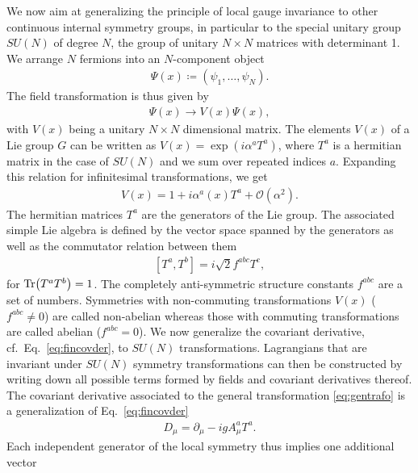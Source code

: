 We now aim at generalizing the principle of local gauge invariance
to other continuous internal symmetry groups, in particular to the special
unitary group $SU(N)$ of degree $N$, the group of unitary $N\times N$
matrices with determinant 1. We arrange $N$ fermions into an
$N$-component object 
\begin{align}
  \Psi(x) \coloneqq (\psi_1,\dots,\psi_N).
\end{align}
The field transformation is thus
given by 
\begin{align}\label{eq:gentrafo}
  \Psi(x) \rightarrow V(x)\Psi(x),
\end{align}
with $V(x)$ being a unitary $N\times N$ dimensional matrix. The
elements $V(x)$
of a Lie group $G$ can be written as $V(x)=\exp(i\alpha^a
  T^a)$, where $T^a$ is a hermitian matrix in the case of $SU(N)$ and we sum over repeated
  indices $a$. Expanding this relation for infinitesimal transformations, we get
\begin{align}
  V(x) = 1 +i\alpha^a(x) T^a +\mathcal{O}(\alpha^2).
\end{align}
The hermitian matrices $T^a$ are the generators of the Lie group. The
associated simple Lie
algebra is defined by the vector space spanned by the generators
as well as the commutator relation between them
\begin{align}\label{eq:commgen}
  [T^a,T^b] = i\sqrt{2}f^{abc}T^c,
\end{align}
for $\Tr(T^aT^b)=1$. The completely anti-symmetric structure constants $f^{abc}$ are a set
of numbers. Symmetries with non-commuting transformations
$V(x)$ ($f^{abc}\neq 0$) are called non-abelian whereas those with commuting
transformations are called abelian ($f^{abc}=0$). We now generalize the covariant derivative, cf.~Eq.~\ref{eq:fincovder},
to $SU(N)$ transformations. Lagrangians that are invariant under $SU(N)$ symmetry
transformations can then be constructed by writing down all possible
terms formed by fields and covariant derivatives thereof. The covariant
derivative associated to the general transformation
\eqref{eq:gentrafo} is a generalization of
Eq.~\eqref{eq:fincovder}
\begin{align}\label{eq:covderym}
  D_\mu = \partial_\mu - i g A^a_\mu T^a.
\end{align}
Each independent generator of the local symmetry thus implies one additional vector
